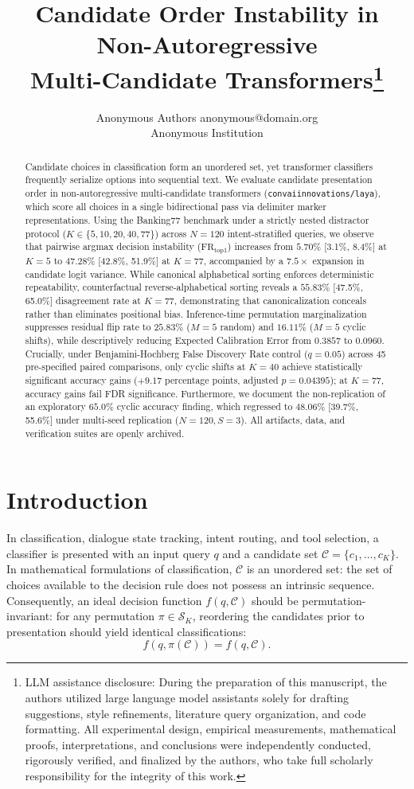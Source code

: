 \documentclass[10pt]{article}
\title{Candidate Order Instability in Non-Autoregressive\\Multi-Candidate Transformers\thanks{LLM assistance disclosure: During the preparation of this manuscript, the authors utilized large language model assistants solely for drafting suggestions, style refinements, literature query organization, and code formatting. All experimental design, empirical measurements, mathematical proofs, interpretations, and conclusions were independently conducted, rigorously verified, and finalized by the authors, who take full scholarly responsibility for the integrity of this work.}}
\author{\name Anonymous Authors \email anonymous@domain.org \\
      \addr Anonymous Institution}
\begin{document}
\maketitle

\begin{abstract}
Candidate choices in classification form an unordered set, yet transformer classifiers frequently serialize options into sequential text. We evaluate candidate presentation order in non-autoregressive multi-candidate transformers (\nolinkurl{convaiinnovations/laya}), which score all choices in a single bidirectional pass via delimiter marker representations. Using the Banking77 benchmark under a strictly nested distractor protocol ($K \in \{5, 10, 20, 40, 77\}$) across $N=120$ intent-stratified queries, we observe that pairwise argmax decision instability ($\mathrm{FR}_{\mathrm{top1}}$) increases from $5.70\%$ [3.1\%, 8.4\%] at $K=5$ to $47.28\%$ [42.8\%, 51.9\%] at $K=77$, accompanied by a $7.5\times$ expansion in candidate logit variance. While canonical alphabetical sorting enforces deterministic repeatability, counterfactual reverse-alphabetical sorting reveals a $55.83\%$ [47.5\%, 65.0\%] disagreement rate at $K=77$, demonstrating that canonicalization conceals rather than eliminates positional bias. Inference-time permutation marginalization suppresses residual flip rate to $25.83\%$ ($M=5$ random) and $16.11\%$ ($M=5$ cyclic shifts), while descriptively reducing Expected Calibration Error from $0.3857$ to $0.0960$. Crucially, under Benjamini-Hochberg False Discovery Rate control ($q=0.05$) across 45 pre-specified paired comparisons, only cyclic shifts at $K=40$ achieve statistically significant accuracy gains ($+9.17$ percentage points, adjusted $p=0.04395$); at $K=77$, accuracy gains fail FDR significance. Furthermore, we document the non-replication of an exploratory $65.0\%$ cyclic accuracy finding, which regressed to $48.06\%$ [39.7\%, 55.6\%] under multi-seed replication ($N=120, S=3$). All artifacts, data, and verification suites are openly archived.
\end{abstract}

\section{Introduction}

In classification, dialogue state tracking, intent routing, and tool selection, a classifier is presented with an input query $q$ and a candidate set $\mathcal{C} = \{c_1, \dots, c_K\}$. In mathematical formulations of classification, $\mathcal{C}$ is an unordered set: the set of choices available to the decision rule does not possess an intrinsic sequence. Consequently, an ideal decision function $f(q, \mathcal{C})$ should be permutation-invariant: for any permutation $\pi \in \mathcal{S}_K$, reordering the candidates prior to presentation should yield identical classifications:
\begin{equation}
f(q, \pi(\mathcal{C})) = f(q, \mathcal{C}).
\end{equation}
\end{document}
